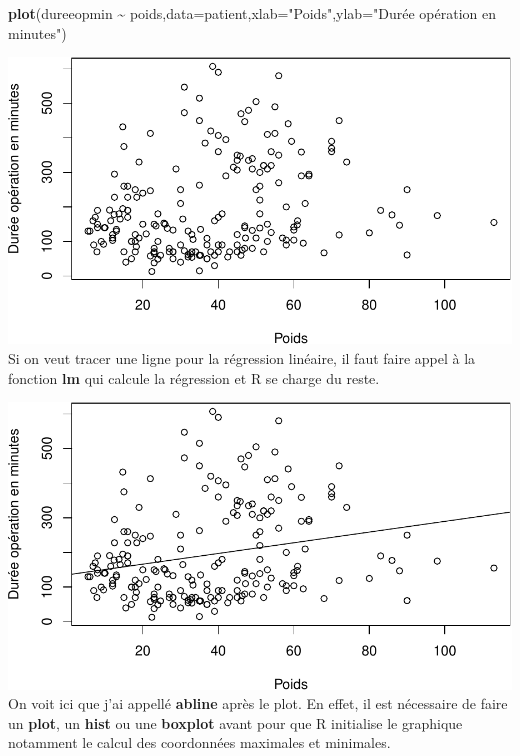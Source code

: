 \documentclass[
]{book}
\newenvironment{Shaded}{\begin{snugshade}}{\end{snugshade}}
\newcommand{\AttributeTok}[1]{\textcolor[rgb]{0.13,0.29,0.53}{#1}}
\newcommand{\FunctionTok}[1]{\textcolor[rgb]{0.13,0.29,0.53}{\textbf{#1}}}
\newcommand{\NormalTok}[1]{#1}
\newcommand{\OtherTok}[1]{\textcolor[rgb]{0.56,0.35,0.01}{#1}}
\newcommand{\SpecialCharTok}[1]{\textcolor[rgb]{0.81,0.36,0.00}{\textbf{#1}}}
\newcommand{\StringTok}[1]{\textcolor[rgb]{0.31,0.60,0.02}{#1}}
\begin{document}
\begin{Shaded}
\begin{Highlighting}[]
\FunctionTok{plot}\NormalTok{(dureeopmin }\SpecialCharTok{\textasciitilde{}}\NormalTok{ poids,}\AttributeTok{data=}\NormalTok{patient,}\AttributeTok{xlab=}\StringTok{"Poids"}\NormalTok{,}\AttributeTok{ylab=}\StringTok{"Durée opération en minutes"}\NormalTok{)}
\end{Highlighting}
\end{Shaded}

\includegraphics{_main_files/figure-latex/poids9-1.pdf}
Si on veut tracer une ligne pour la régression linéaire, il faut faire appel
à la fonction \textbf{lm} qui calcule la régression et R se charge du reste.

\begin{Shaded}
\end{Shaded}

\includegraphics{_main_files/figure-latex/poids10-1.pdf}
On voit ici que j'ai appellé \textbf{abline} après le plot. En effet, il est nécessaire
de faire un \textbf{plot}, un \textbf{hist} ou une \textbf{boxplot} avant pour que R initialise
le graphique notamment le calcul des coordonnées maximales et minimales.
\end{document}
